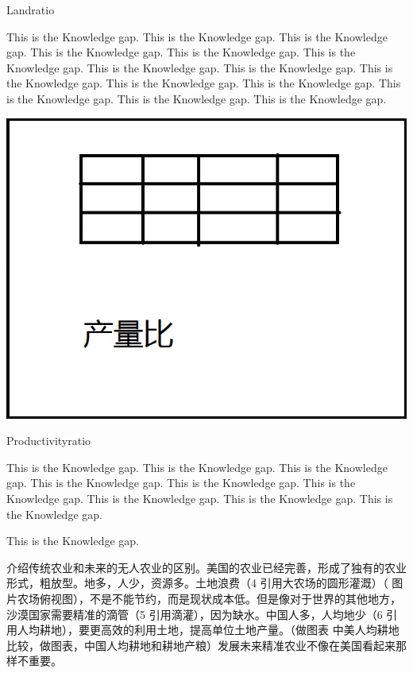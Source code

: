 \documentclass[12pt]{article}
\begin{document}
\begin{flushleft}
\begin{table}[h!]
\begin{center}
		\caption{Landratio}
	\end{center}
\end{table}
This is the Knowledge gap. This is the Knowledge gap. This is the Knowledge gap. This is the Knowledge gap. This is the Knowledge gap. \cite{evers1996automated}This is the Knowledge gap. This is the Knowledge gap. This is the Knowledge gap. This is the Knowledge gap. This is the Knowledge gap. This is the Knowledge gap. This is the Knowledge gap. This is the Knowledge gap. This is the Knowledge gap. 
\begin{table}[h!]
	\begin{center}
		\includegraphics[scale = 0.6]{productivityratio.jpg}
		\caption{Productivityratio}
	\end{center}
\end{table}
This is the Knowledge gap. This is the Knowledge gap. This is the Knowledge gap. This is the Knowledge gap. This is the Knowledge gap. This is the Knowledge gap. This is the Knowledge gap. This is the Knowledge gap. This is the Knowledge gap.

This is the Knowledge gap. \cite{gaskins1987flow}


介绍传统农业和未来的无人农业的区别。美国的农业已经完善，形成了独有的农业形式，粗放型。地多，人少，资源多。土地浪费（4 引用大农场的圆形灌溉）（  图片农场俯视图），不是不能节约，而是现状成本低。但是像对于世界的其他地方，沙漠国家需要精准的滴管（5 引用滴灌），因为缺水。中国人多，人均地少（6 引用人均耕地），要更高效的利用土地，提高单位土地产量。（做图表 中美人均耕地比较，做图表，中国人均耕地和耕地产粮）发展未来精准农业不像在美国看起来那样不重要。


\end{flushleft}
\end{document}
